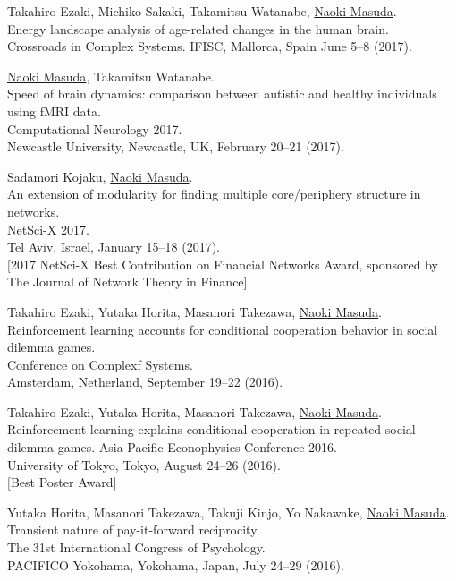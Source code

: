 \documentclass[11pt,letter]{article}
\begin{document}
\begin{etaremune}
\item Takahiro Ezaki, Michiko Sakaki, Takamitsu Watanabe, \underline{Naoki Masuda}.\\
Energy landscape analysis of age-related changes in the human brain.\\
Crossroads in Complex Systems. IFISC, Mallorca, Spain June 5--8 (2017).

\item \underline{Naoki Masuda}, Takamitsu Watanabe.\\
Speed of brain dynamics: comparison between autistic and healthy individuals using fMRI data.\\
Computational Neurology 2017.\\
Newcastle University, Newcastle, UK, February 20--21 (2017).

\item Sadamori Kojaku, \underline{Naoki Masuda}.\\
An extension of modularity for finding multiple core/periphery structure in networks.\\
NetSci-X 2017.\\
Tel Aviv, Israel, January 15--18 (2017).\\
$[$2017 NetSci-X Best Contribution on Financial Networks Award, sponsored by The Journal of Network Theory in Finance$]$

\item Takahiro Ezaki, Yutaka Horita, Masanori Takezawa, \underline{Naoki Masuda}.\\
Reinforcement learning accounts for conditional cooperation behavior in social dilemma games.\\
Conference on Complexf Systems.\\
Amsterdam, Netherland, September 19--22 (2016).

\item Takahiro Ezaki, Yutaka Horita, Masanori Takezawa, \underline{Naoki Masuda}.\\
Reinforcement learning explains conditional cooperation in repeated social dilemma games.
Asia-Pacific Econophysics Conference 2016.\\
University of Tokyo, Tokyo, August 24--26 (2016).\\
$[$Best Poster Award$]$

\item Yutaka Horita, Masanori Takezawa, Takuji Kinjo, Yo Nakawake, \underline{Naoki Masuda}.\\
Transient nature of pay-it-forward reciprocity.\\
The 31st International Congress of Psychology.\\
PACIFICO Yokohama, Yokohama, Japan, July 24--29 (2016).


\end{etaremune}
\end{document}
